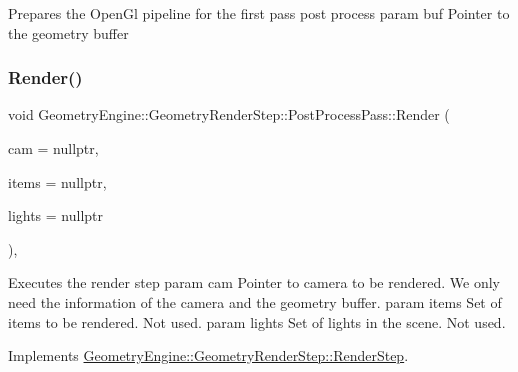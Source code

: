 Prepares the Open\+Gl pipeline for the first pass post process param buf Pointer to the geometry buffer \mbox{\label{class_geometry_engine_1_1_geometry_render_step_1_1_post_process_pass_a2ebe2a0b940e47ccd10e649bff77138d}} 
\subsubsection{\texorpdfstring{Render()}{Render()}}
{\footnotesize\ttfamily void Geometry\+Engine\+::\+Geometry\+Render\+Step\+::\+Post\+Process\+Pass\+::\+Render (\begin{DoxyParamCaption}\item[{\mbox{\hyperlink{class_geometry_engine_1_1_geometry_world_item_1_1_geometry_camera_1_1_camera}{Geometry\+World\+Item\+::\+Geometry\+Camera\+::\+Camera}} $\ast$}]{cam = {\ttfamily nullptr},  }\item[{std\+::unordered\+\_\+set$<$ \mbox{\hyperlink{class_geometry_engine_1_1_geometry_world_item_1_1_geometry_item_1_1_geometry_item}{Geometry\+World\+Item\+::\+Geometry\+Item\+::\+Geometry\+Item}} $\ast$ $>$ $\ast$}]{items = {\ttfamily nullptr},  }\item[{std\+::unordered\+\_\+set$<$ \mbox{\hyperlink{class_geometry_engine_1_1_geometry_world_item_1_1_geometry_light_1_1_light}{Geometry\+World\+Item\+::\+Geometry\+Light\+::\+Light}} $\ast$ $>$ $\ast$}]{lights = {\ttfamily nullptr} }\end{DoxyParamCaption})\hspace{0.3cm}{\ttfamily [override]}, {\ttfamily [virtual]}}

Executes the render step param cam Pointer to camera to be rendered. We only need the information of the camera and the geometry buffer. param items Set of items to be rendered. Not used. param lights Set of lights in the scene. Not used. 

Implements \mbox{\hyperlink{class_geometry_engine_1_1_geometry_render_step_1_1_render_step_a9b054ee8f38304319a9d03ba3e173dcd}{Geometry\+Engine\+::\+Geometry\+Render\+Step\+::\+Render\+Step}}.

\mbox{\label{class_geometry_engine_1_1_geometry_render_step_1_1_post_process_pass_a3d555943a9bc2b3105e71b8984b1ce0b}} 
